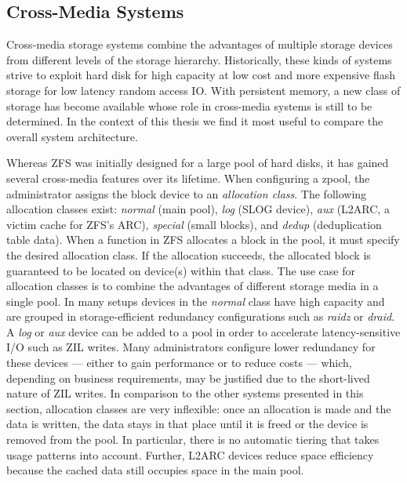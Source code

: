 \documentclass[12pt,a4paper,twoside]{book}
\begin{document}
\subsection{Cross-Media Systems}\label{sec:cross_media_storage_systems}
Cross-media storage systems combine the advantages of multiple storage devices from different levels of the storage hierarchy.
Historically, these kinds of systems strive to exploit hard disk for high capacity at low cost and more expensive flash storage for low latency random access IO.
With persistent memory, a new class of storage has become available whose role in cross-media systems is still to be determined.
In the context of this thesis we find it most useful to compare the overall system architecture.

Whereas ZFS was initially designed for a large pool of hard disks, it has gained several cross-media features over its lifetime.
When configuring a zpool, the administrator assigns the block device to an \textit{allocation class}.
The following allocation classes exist: \textit{normal} (main pool), \textit{log} (SLOG device), \textit{aux} (L2ARC, a victim cache for ZFS's ARC), \textit{special} (small blocks), and \textit{dedup} (deduplication table data).
When a function in ZFS allocates a block in the pool, it must specify the desired allocation class.
If the allocation succeeds, the allocated block is guaranteed to be located on device(s) within that class.
The use case for allocation classes is to combine the advantages of different storage media in a single pool.
In many setups devices in the \textit{normal} class have high capacity and are grouped in storage-efficient redundancy configurations such as \textit{raidz} or \textit{draid}.
A \textit{log} or \textit{aux} device can be added to a pool in order to accelerate latency-sensitive I/O such as ZIL writes.
Many administrators configure lower redundancy for these devices --- either to gain performance or to reduce costs --- which, depending on business requirements, may be justified due to the short-lived nature of ZIL writes.
In comparison to the other systems presented in this section, allocation classes are very inflexible:
once an allocation is made and the data is written, the data stays in that place until it is freed or the device is removed from the pool.
In particular, there is no automatic tiering that takes usage patterns into account.
Further, L2ARC devices reduce space efficiency because the cached data still occupies space in the main pool.
\end{document}
